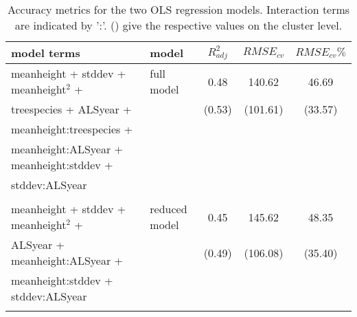\begin{table*}[!htbp]
	\begin{center}
	\caption{Accuracy metrics for the two OLS regression models. Interaction terms are indicated by ':'. () give the respective values on the cluster level.} 
	\label{tab:modacc_modterms}
    {\small %
	\begin{tabular}{llccc}
  \hline
model terms & model & $R^2_{adj}$ & $RMSE_{cv}$ & $RMSE_{cv}\%$ \\ 
  \hline
meanheight + stddev + meanheight$^2$ +  & full model &  0.48 & 140.62  & 46.69 \\
treespecies + ALSyear + & & (0.53) &  (101.61) & (33.57) \\ 
meanheight:treespecies + \\ meanheight:ALSyear + meanheight:stddev + \\ stddev:ALSyear &&& \\ \\
meanheight + stddev + meanheight$^2$ + & reduced model  & 0.45  & 145.62 & 48.35 \\
ALSyear + meanheight:ALSyear + & & (0.49) & (106.08) & (35.40) \\
meanheight:stddev + stddev:ALSyear &&& \\ \\
\hline
\hline
\end{tabular}
}%
\end{center}
\end{table*}

